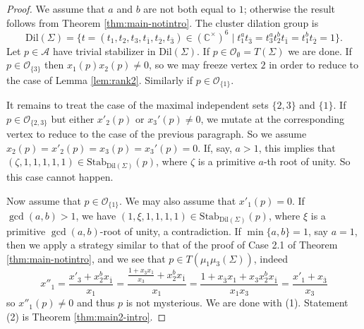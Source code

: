 \documentclass[10pt,a4paper]{amsart}
\newcommand{\C}{\mathbb{C}}
\newcommand{\JS}[1]{\textcolor{teal}{[JS: \footnotesize #1]}}
\newcommand{\Stab}{\mathrm{Stab}}
\newcommand{\cS}[1]{\textcolor{purple}{[SN: \footnotesize $\blacksquare$ #1 $\blacksquare$]}}
\newcommand{\dil}{\mathrm{Dil}}
\newcommand{\seed}{\Sigma}
\newcommand{\var}{\mathcal{A}}
\begin{document}
\begin{proof}
We assume that $a$ and $b$ are not both equal to $1$; otherwise the result follows from Theorem \ref{thm:main-notintro}. The cluster dilation group is
\[
\dil(\seed) = \{t = (t_1, t_2, t_3, t_{\overline{1}}, t_{\overline{2}}, t_{\overline{3}}) \in  (\C^{\times})^{6} \mid t_1^{a}t_{\overline{3}} = t_3^{a}t_2^{b}t_{\overline{1}} = t_{1}^{b}t_{\overline{2}} = 1\}.
\]
Let $p \in \var$ have trivial stabilizer in $\dil(\seed)$. If $p \in \mathcal{O}_{\emptyset} = T(\seed)$ we are done. If $p \in \mathcal{O}_{\{3\}}$ then $x_1(p)x_2(p)\neq 0$, so we may freeze vertex $2$ in order to reduce to the case of Lemma \ref{lem:rank2}. Similarly if $p \in \mathcal{O}_{\{1\}}$. 

It remains to treat the case of the maximal independent sets $\{2,3\}$ and $\{1\}$. If $p \in \mathcal{O}_{\{2,3\}}$ but either $x'_2(p)$ or $x_3'(p) \neq 0$, we mutate at the corresponding vertex to reduce to the case of the previous paragraph. So we assume $x_2(p) = x'_2(p) = x_3(p) = x_3'(p) = 0$. If, say, $a > 1$, this implies that $(\zeta, 1, 1, 1, 1, 1) \in \Stab_{\dil(\seed)}(p)$, where $\zeta$ is a primitive $a$-th root of unity. So this case cannot happen.

Now assume that $p \in \mathcal{O}_{\{1\}}$. We may also assume that $x'_1(p) = 0$. If $\gcd(a,b) > 1$, we have $(1, \xi, 1, 1, 1, 1) \in \Stab_{\dil(\seed)}(p)$, where $\xi$ is a primitive $\gcd(a,b)$-root of unity, a contradiction. If $\min\{a,b\} = 1$, say $a = 1$, then we apply a strategy similar to that of the proof of Case 2.1 of Theorem \ref{thm:main-notintro}, and we see that $p \in T(\mu_1\mu_3(\seed))$, indeed
\[
x''_1 = \frac{x'_3 + x_2^{b}x_{\overline{1}}}{x_1} = 
\frac{\frac{1 + x_{\overline{3}}x_1}{x_3}+ x_2^{b}x_{\overline{1}}}{x_1} = 
\frac{1 + x_{\overline{3}}x_1 + x_{3}x_2^{b}x_{\overline{1}}}{x_1x_3} = 
\frac{x'_1 + x_{\overline{3}}}{x_3}
\]
so $x''_1(p) \neq 0$ and thus $p$ is not mysterious. We are done with (1). Statement (2) is Theorem \ref{thm:main2-intro}. %
\end{proof}
\end{document}
